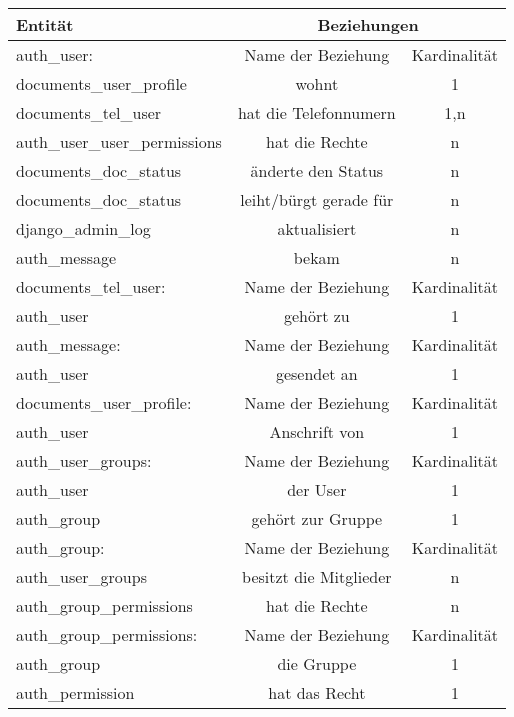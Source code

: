 \begin{tabular}[ht]{|l||c|c|}
  \hline
  Entit\"at & \multicolumn{2}{c|}{Beziehungen} \\
  \hline\hline\hline
    
  auth\_user: & Name der Beziehung & Kardinalität\\
  \hline\hline
  documents\_user\_profile & wohnt & 1\\
  \hline
  documents\_tel\_user & hat die Telefonnumern & 1,n\\
  \hline
  auth\_user\_user\_permissions & hat die Rechte & n\\
  \hline
  documents\_doc\_status & änderte den Status & n\\  
  \hline
  documents\_doc\_status & leiht/bürgt gerade für & n\\
  \hline
  django\_admin\_log & aktualisiert & n\\
  \hline
  auth\_message & bekam & n\\
  \hline\hline\hline
  
  documents\_tel\_user:  & Name der Beziehung &  Kardinalit\"at\\
  \hline\hline
  auth\_user & gehört zu & 1 \\
  \hline\hline\hline 
  
  auth\_message: & Name der Beziehung &  Kardinalit\"at\\
  \hline\hline
  auth\_user & gesendet an & 1 \\
  \hline\hline\hline 
  
  documents\_user\_profile:  & Name der Beziehung &  Kardinalit\"at\\
  \hline\hline
  auth\_user & Anschrift von & 1 \\
  \hline\hline\hline
  
  auth\_user\_groups:  & Name der Beziehung &  Kardinalit\"at\\
  \hline\hline
  auth\_user & der User & 1 \\
  \hline
  auth\_group & gehört zur Gruppe & 1 \\
  \hline\hline\hline
  
  auth\_group: & Name der Beziehung &  Kardinalit\"at\\
  \hline\hline
  auth\_user\_groups & besitzt die Mitglieder & n \\
  \hline
  auth\_group\_permissions & hat die Rechte & n \\
  \hline\hline\hline 

  auth\_group\_permissions: & Name der Beziehung &  Kardinalit\"at\\
  \hline\hline
  auth\_group & die Gruppe & 1 \\
  \hline
  auth\_permission & hat das Recht & 1 \\
  \hline\hline\hline 
  

\end{tabular}
